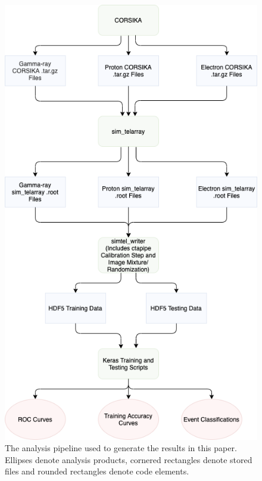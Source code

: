 \begin{table}[ht]
    \centering
    \caption{Training hyperparameters used; these were the same throughout all the networks during the initial training for both the point source and diffuse cases. The diffuse ES runs also used these hyperparameters.}
    \label{table:hyperparams}
\end{table}

\begin{figure}
  \centering
  \includegraphics[width=0.7
  \textwidth]{figures/waveformstructure.png}
  \caption{The analysis pipeline used to generate the results in this paper. Ellipses denote analysis products, cornered rectangles denote stored files and rounded rectangles denote code elements.
  }
  \label{fig:wavelearn}
\end{figure}

